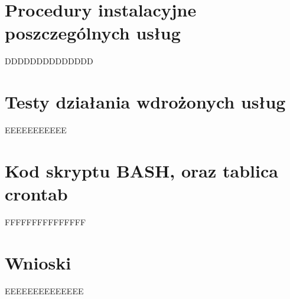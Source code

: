 \documentclass[a4paper]{article}
\begin{document}
\section{Procedury instalacyjne poszczególnych usług}
DDDDDDDDDDDDDD
\section{Testy działania wdrożonych usług}
EEEEEEEEEEE
\section{Kod skryptu BASH, oraz tablica crontab}
FFFFFFFFFFFFFFF
\section{Wnioski}
EEEEEEEEEEEEEE
\newpage
\nocite{k8s-docs}
\nocite{k8s-blog}
\nocite{k8s-github}
\printbibliography[heading=bibnumbered, label=Literatura, title=Literatura]
\end{document}
